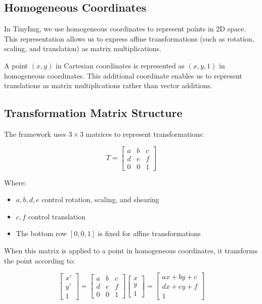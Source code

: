 \documentclass{article}
\begin{document}
\subsection{Homogeneous Coordinates}

In TinyImg, we use homogeneous coordinates to represent points in 2D space. This representation allows us to express affine transformations (such as rotation, scaling, and translation) as matrix multiplications.

A point $(x, y)$ in Cartesian coordinates is represented as $(x, y, 1)$ in homogeneous coordinates. This additional coordinate enables us to represent translations as matrix multiplications rather than vector additions.

\subsection{Transformation Matrix Structure}

The framework uses $3 \times 3$ matrices to represent transformations:

\begin{equation}
T = \begin{bmatrix}
a & b & c \\
d & e & f \\
0 & 0 & 1
\end{bmatrix}
\end{equation}

Where:
\begin{itemize}
    \item $a, b, d, e$ control rotation, scaling, and shearing
    \item $c, f$ control translation
    \item The bottom row $[0, 0, 1]$ is fixed for affine transformations
\end{itemize}

When this matrix is applied to a point in homogeneous coordinates, it transforms the point according to:

\begin{equation}
\begin{bmatrix}
x' \\
y' \\
1
\end{bmatrix} = 
\begin{bmatrix}
a & b & c \\
d & e & f \\
0 & 0 & 1
\end{bmatrix}
\begin{bmatrix}
x \\
y \\
1
\end{bmatrix} = 
\begin{bmatrix}
ax + by + c \\
dx + ey + f \\
1
\end{bmatrix}
\end{equation}
\end{document}

